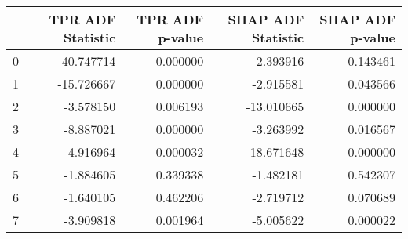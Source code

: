 \begin{tabular}{lrrrr}
\toprule
 & TPR ADF Statistic & TPR ADF p-value & SHAP ADF Statistic & SHAP ADF p-value \\
\midrule
0 & -40.747714 & 0.000000 & -2.393916 & 0.143461 \\
1 & -15.726667 & 0.000000 & -2.915581 & 0.043566 \\
2 & -3.578150 & 0.006193 & -13.010665 & 0.000000 \\
3 & -8.887021 & 0.000000 & -3.263992 & 0.016567 \\
4 & -4.916964 & 0.000032 & -18.671648 & 0.000000 \\
5 & -1.884605 & 0.339338 & -1.482181 & 0.542307 \\
6 & -1.640105 & 0.462206 & -2.719712 & 0.070689 \\
7 & -3.909818 & 0.001964 & -5.005622 & 0.000022 \\
\bottomrule
\end{tabular}
